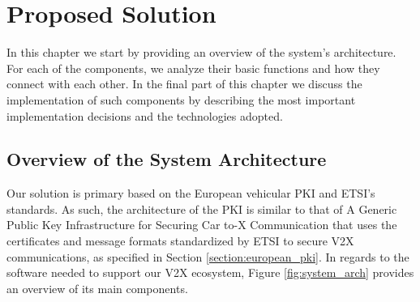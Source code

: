 \chapter{Proposed Solution}
\label{chapter:implementation}
In this chapter we start by providing an overview of the system's architecture. For each of the components, we analyze their basic functions and how they connect with each other. In the final part of this chapter we discuss the implementation of such components by describing the most important implementation decisions and the technologies adopted.



\section{Overview of the System Architecture}\label{section:architecture}
Our solution is primary based on the European vehicular PKI and ETSI's standards. As such, the architecture of the PKI is similar to that of A Generic Public Key Infrastructure for Securing Car to-X Communication \cite{generic_eu} that uses the certificates and message formats standardized by ETSI \cite{etsi_formats} to secure V2X communications, as specified in Section \ref{section:european_pki}. In regards to the software needed to support our V2X ecosystem, Figure \ref{fig:system_arch} provides an overview of its main components.

